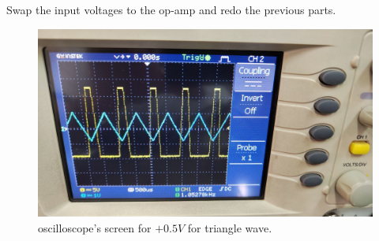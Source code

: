 \documentclass[11pt]{article}
\newcommand{\PicScale}{0.2}
\begin{document}
\begin{question}
\begin{subquestion}{Swap the input voltages to the op-amp and redo the previous parts.}
{\begin{figure}[H]
                \includegraphics[scale=\PicScale,angle=0]{Fig/54.jpeg}
                \caption{oscilloscope's screen for $+0.5V$ for triangle wave.}
            \end{figure}
        }
    \end{subquestion}


\end{question}

\end{document}
